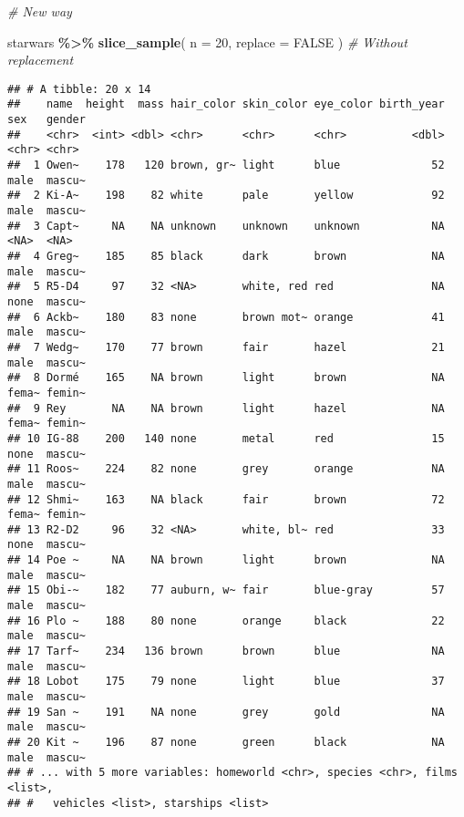 \documentclass[
]{book}
\newenvironment{Shaded}{\begin{snugshade}}{\end{snugshade}}
\newcommand{\CommentTok}[1]{\textcolor[rgb]{0.56,0.35,0.01}{\textit{#1}}}
\newcommand{\DataTypeTok}[1]{\textcolor[rgb]{0.13,0.29,0.53}{#1}}
\newcommand{\DecValTok}[1]{\textcolor[rgb]{0.00,0.00,0.81}{#1}}
\newcommand{\KeywordTok}[1]{\textcolor[rgb]{0.13,0.29,0.53}{\textbf{#1}}}
\newcommand{\NormalTok}[1]{#1}
\newcommand{\OperatorTok}[1]{\textcolor[rgb]{0.81,0.36,0.00}{\textbf{#1}}}
\newcommand{\OtherTok}[1]{\textcolor[rgb]{0.56,0.35,0.01}{#1}}
\newcommand{\StringTok}[1]{\textcolor[rgb]{0.31,0.60,0.02}{#1}}
\begin{document}
\begin{Shaded}
\begin{Highlighting}[]
\CommentTok{\# New way}

\NormalTok{starwars }\OperatorTok{\%\textgreater{}\%}
\StringTok{  }\KeywordTok{slice\_sample}\NormalTok{(}
    \DataTypeTok{n =} \DecValTok{20}\NormalTok{,}
    \DataTypeTok{replace =} \OtherTok{FALSE}
\NormalTok{  ) }\CommentTok{\# Without replacement}
\end{Highlighting}
\end{Shaded}

\begin{verbatim}
## # A tibble: 20 x 14
##    name  height  mass hair_color skin_color eye_color birth_year sex   gender
##    <chr>  <int> <dbl> <chr>      <chr>      <chr>          <dbl> <chr> <chr> 
##  1 Owen~    178   120 brown, gr~ light      blue              52 male  mascu~
##  2 Ki-A~    198    82 white      pale       yellow            92 male  mascu~
##  3 Capt~     NA    NA unknown    unknown    unknown           NA <NA>  <NA>  
##  4 Greg~    185    85 black      dark       brown             NA male  mascu~
##  5 R5-D4     97    32 <NA>       white, red red               NA none  mascu~
##  6 Ackb~    180    83 none       brown mot~ orange            41 male  mascu~
##  7 Wedg~    170    77 brown      fair       hazel             21 male  mascu~
##  8 Dormé    165    NA brown      light      brown             NA fema~ femin~
##  9 Rey       NA    NA brown      light      hazel             NA fema~ femin~
## 10 IG-88    200   140 none       metal      red               15 none  mascu~
## 11 Roos~    224    82 none       grey       orange            NA male  mascu~
## 12 Shmi~    163    NA black      fair       brown             72 fema~ femin~
## 13 R2-D2     96    32 <NA>       white, bl~ red               33 none  mascu~
## 14 Poe ~     NA    NA brown      light      brown             NA male  mascu~
## 15 Obi-~    182    77 auburn, w~ fair       blue-gray         57 male  mascu~
## 16 Plo ~    188    80 none       orange     black             22 male  mascu~
## 17 Tarf~    234   136 brown      brown      blue              NA male  mascu~
## 18 Lobot    175    79 none       light      blue              37 male  mascu~
## 19 San ~    191    NA none       grey       gold              NA male  mascu~
## 20 Kit ~    196    87 none       green      black             NA male  mascu~
## # ... with 5 more variables: homeworld <chr>, species <chr>, films <list>,
## #   vehicles <list>, starships <list>
\end{verbatim}
\end{document}
